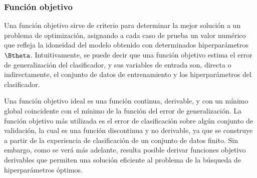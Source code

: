 %
\subsubsection{Función objetivo}
%
Una función objetivo sirve de criterio para determinar la mejor
solución a un problema de optimización, asignando a cada caso de
prueba un valor numérico que refleja la idoneidad del modelo obtenido
con determinados hiperparámetros $\Btheta$.
Intuitivamente, se puede decir que una función objetivo estima el
error de generalización del clasificador, y sus variables de entrada
son, directa o indirectamente, el conjunto de datos de entrenamiento y
los hiperparámetros del clasificador.

Una función objetivo ideal es una función continua, derivable, y con
un mínimo global coincidente con el mínimo de la función del error de
generalización. La función objetivo más utilizada es el error
de clasificación sobre algún conjunto de validación, la cual es una
función discontinua y no derivable, ya que se construye a partir de la
experiencia de clasificación de un conjunto de datos finito.
Sin embargo, como se verá más adelante, resulta posible derivar
funciones objetivo derivables que permiten una solución eficiente al
problema de la búsqueda de hiperparámetros óptimos.
